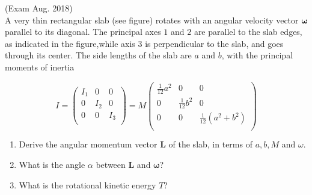 \documentclass{article}
\begin{document}
        (Exam Aug. 2018)\\
        A very thin rectangular slab (see figure) rotates with an angular velocity vector $\boldsymbol\omega$ parallel to its diagonal. The principal axes $1$ and $2$ are parallel to the slab edges, as indicated in the figure,while axis $3$ is perpendicular to the slab, and goes through its center. The side lengths of the slab are $a$ and $b$, with the principal moments of inertia

        \begin{equation*}
            I = 
            \begin{pmatrix}
                I_{1} & 0 & 0 \\
                0 & I_{2} & 0 \\
                0 & 0 & I_{3} \\
            \end{pmatrix}
            = M
            \begin{pmatrix}
                \frac{1}{12} a^2& 0 & 0 \\
                0 & \frac{1}{12} b^2 & 0 \\
                0 & 0 & \frac{1}{12} (a^2 + b^2)\\
            \end{pmatrix}
        \end{equation*}
        \begin{enumerate}[label=(\alph*)]
            \item Derive the angular momentum vector $\mathbf{L}$ of the slab, in terms of $a, b, M$ and $\omega$.
            \item What is the angle $\alpha$ between $\mathbf L$ and $\boldsymbol \omega$?
            \item What is the rotational kinetic energy $T$?
        \end{enumerate}
\end{document}
